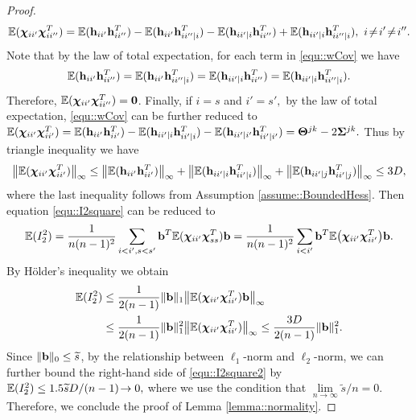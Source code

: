 \documentclass[twoside,11pt]{article}
\newcommand*{\limn}{\lim \limits_{n\rightarrow \infty} }
\begin{document}
\begin{proof}
\begin{align*}%
\EE(\bchi_{ii'}\bchi^T_{ii''})=\EE(\hb_{ii'}\hb^T_{ii''})-\EE(\hb_{ii'}\hb^T_{ii''\mid i}) -\EE(\hb_{ii'\mid i}\hb^T_{ii''})+\EE(\hb_{i i'\mid i}\hb^T_{ii''\mid i}), ~i\!\neq\!i'\!\neq \! i''.
\end{align*}
 Note that by the law of total expectation, for each term in \eqref{equ::wCov} we have
\begin{align*}
\mathbb{E}(\mathbf{h}_{ii'}\mathbf{h}^T_{ii''})=\mathbb{E}(\mathbf{h}_{ii'}\mathbf{h}^T_{ii''\mid i})  = \mathbb{E}(\mathbf{h}_{ii'\mid i}\mathbf{h}^T_{ii''})=\mathbb{E}(\mathbf{h}_{i i'\mid i}\mathbf{h}^T_{ii'' \mid i}).\end{align*}
Therefore, $\mathbb{E}(\bm{\chi}_{ii'}\bm{\chi}^T_{ii''})=\bm{0}$.
Finally, if $i = s$ and $i'= s',$ by the law of total expectation, \eqref{equ::wCov} can be further reduced to 
$
\mathbb{E}(\bm{\chi}_{ii'}\bm{\chi}^T_{ii'})= \mathbb{E}(\mathbf{h}_{ii'}\mathbf{h}^T_{ii'})-\mathbb{E}(\mathbf{h}_{ii'\mid i}\mathbf{h}^T_{ii'\mid i})-\mathbb{E}(\mathbf{h}_{ii' \mid i'}\mathbf{h}^T_{i i' \mid i'}) = \bm{\Theta}^{jk}- 2\bm{\Sigma} ^{jk}.
$
Thus by triangle inequality we have 
\begin{align*} %
\bigl \| \EE(\bchi_{ii'}\bchi^T_{ii'})\bigr \|_\infty \leq \bigl \| \EE(\hb_{ii'}\hb^T_{ii'})\bigr \|_\infty + \bigl \| \EE(\hb_{ii'|i}\hb^T_{ii'|i})\bigr\|_\infty  + \bigl \| \EE(\hb_{ii'|j}\hb^T_{ii'|j}) \bigr \|_\infty \leq 3D,
\end{align*}
where the last inequality follows from Assumption \ref{assume::BoundedHess}.
Then equation \eqref{equ::I2square} can be reduced to 
\begin{align*}
\mathbb{E}(I_{2}^2) = \frac{1}{n(n-1)^2}\sum_{i<i',s<s'}\mathbf{b}^T\mathbb{E}(\bm{\chi}_{ii'} \bm{\chi}_{ss
}^T)\mathbf{b}= \frac{1}{n(n-1)^2 } \sum\limits_{i<i'} \mathbf{b}^T \mathbb{E} \bigl ( \bm{\chi}_{ii'}\bm{\chi}_{ii'}^T \bigr) \mathbf{b}.
\end{align*}
By H\"older's inequality  we obtain
\begin{align}\label{equ::I2square2}
\mathbb{E}(I_{2}^2)  & \leq \frac{1}{ 2(n-1)}  \| \mathbf{b}  \|_1  \bigl\|\mathbb{E}  (\bm{\chi}_{ii'}\bm{\chi}_{ii'}^T ) \mathbf{b}\bigr\|_\infty  \notag \\
& \leq \frac{1}{2(n-1)}  \| \mathbf{b}  \|_1 ^2 \bigl \|\mathbb{E}  ( \bm{\chi}_{ii'}\bm{\chi}_{ii'}^T  ) \bigr\|_\infty \leq \frac{3D}{2(n-1)}  \| \mathbf{b} \|_1 ^2 .
\end{align}
Since $ \| \mathbf{b} \|_0 \leq \widetilde s$, by the relationship between $\ell_1$-norm and $\ell_2$-norm,  we can further bound the right-hand side of \eqref{equ::I2square2} by $
\mathbb{E}(I_{2}^2)\leq     1.5 \widetilde {s} D /(n-1)\!\rightarrow 0,
$
where we use the condition that $\limn \tilde s/n = 0.$ Therefore, we conclude the proof of Lemma \ref{lemma::normality}.
\end{proof}
\end{document}
